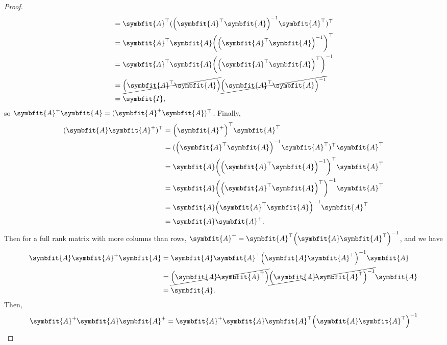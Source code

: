 \documentclass{article}
\theoremstyle{definition}
\newcommand{\mat}[1]{\symbfit{#1}}
\begin{document}
\begin{enumerate}[leftmargin=\labelsep]
\begin{proof}
\begin{align*}
			                              & = \mat{A}^{\top} (\qty(\mat{A}^{\top}\mat{A})^{-1}\mat{A}^{\top})^{\top}           \\
			                              & = \mat{A}^{\top} \mat{A} \qty(\qty(\mat{A}^{\top}\mat{A})^{-1})^{\top}             \\
			                              & = \mat{A}^{\top} \mat{A} \qty(\qty(\mat{A}^{\top}\mat{A})^{\top})^{-1}             \\
			                              & = \cancel{\qty(\mat{A}^{\top} \mat{A})} \cancel{\qty(\mat{A}^{\top} \mat{A})^{-1}} \\
			                              & = \mat{I},
		      \end{align*}
		      so \(\mat{A}^+\mat{A}= (\mat{A}^+\mat{A})^\top\).
		      Finally,
		      \begin{align*}
			      (\mat{A}\mat{A}^+)^\top & = \qty(\mat{A}^+)^{\top}\mat{A}^\top                                  \\
			                              & = (\qty(\mat{A}^{\top}\mat{A})^{-1}\mat{A}^{\top})^{\top}\mat{A}^\top \\
			                              & = \mat{A}\qty(\qty(\mat{A}^{\top}\mat{A})^{-1})^{\top}\mat{A}^\top    \\
			                              & = \mat{A}\qty(\qty(\mat{A}^{\top}\mat{A})^{\top})^{-1}\mat{A}^\top    \\
			                              & = \mat{A}\qty(\mat{A}^{\top}\mat{A})^{-1}\mat{A}^\top                 \\
			                              & =\mat{A}\mat{A}^+.
		      \end{align*}
		      Then for a full rank matrix with more columns than rows, \(\mat{A}^+ = \mat{A}^\top\qty(\mat{A}\mat{A}^\top)^{-1}\), and we have
		      \begin{align*}
			      \mat{A}\mat{A}^+\mat{A} & = \mat{A}\mat{A}^\top\qty(\mat{A}\mat{A}^\top)^{-1}\mat{A}                               \\
			                              & = \cancel{\qty(\mat{A}\mat{A}^{\top})}\cancel{\qty(\mat{A}\mat{A}^{\top})^{-1} } \mat{A} \\
			                              & = \mat{A}.
		      \end{align*}
		      Then,
		      \begin{align*}
			      \mat{A}^+\mat{A}\mat{A}^+ & = \mat{A}^+\mat{A}\mat{A}^\top\qty(\mat{A}\mat{A}^\top)^{-1}                         \\

\end{align*}
\end{proof}
\end{enumerate}
\end{document}
